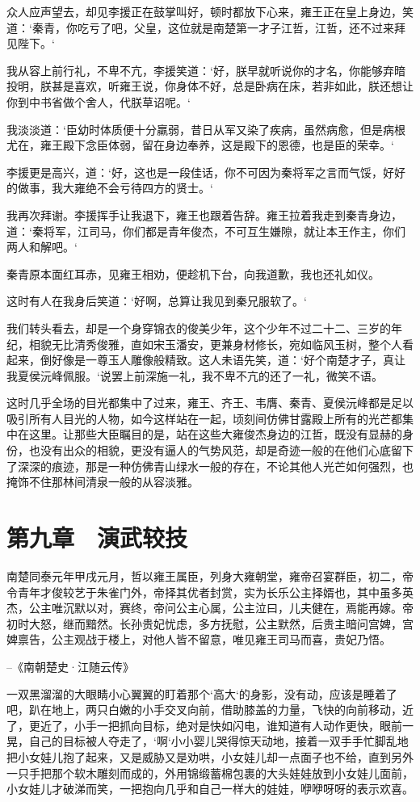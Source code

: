 众人应声望去，却见李援正在鼓掌叫好，顿时都放下心来，雍王正在皇上身边，笑道：‘秦青，你吃亏了吧，父皇，这位就是南楚第一才子江哲，江哲，还不过来拜见陛下。‘

我从容上前行礼，不卑不亢，李援笑道：‘好，朕早就听说你的才名，你能够弃暗投明，朕甚是喜欢，听雍王说，你身体不好，总是卧病在床，若非如此，朕还想让你到中书省做个舍人，代朕草诏呢。‘

我淡淡道：‘臣幼时体质便十分羸弱，昔日从军又染了疾病，虽然病愈，但是病根尤在，雍王殿下念臣体弱，留在身边奉养，这是殿下的恩德，也是臣的荣幸。‘

李援更是高兴，道：‘好，这也是一段佳话，你不可因为秦将军之言而气馁，好好的做事，我大雍绝不会亏待四方的贤士。‘

我再次拜谢。李援挥手让我退下，雍王也跟着告辞。雍王拉着我走到秦青身边，道：‘秦将军，江司马，你们都是青年俊杰，不可互生嫌隙，就让本王作主，你们两人和解吧。‘

秦青原本面红耳赤，见雍王相劝，便趁机下台，向我道歉，我也还礼如仪。

这时有人在我身后笑道：‘好啊，总算让我见到秦兄服软了。‘

我们转头看去，却是一个身穿锦衣的俊美少年，这个少年不过二十二、三岁的年纪，相貌无比清秀俊雅，直如宋玉潘安，更兼身材修长，宛如临风玉树，整个人看起来，倒好像是一尊玉人雕像般精致。这人未语先笑，道：‘好个南楚才子，真让我夏侯沅峰佩服。‘说罢上前深施一礼，我不卑不亢的还了一礼，微笑不语。

这时几乎全场的目光都集中了过来，雍王、齐王、韦膺、秦青、夏侯沅峰都是足以吸引所有人目光的人物，如今这样站在一起，顷刻间仿佛甘露殿上所有的光芒都集中在这里。让那些大臣瞩目的是，站在这些大雍俊杰身边的江哲，既没有显赫的身份，也没有出众的相貌，更没有逼人的气势风范，却是奇迹一般的在他们心底留下了深深的痕迹，那是一种仿佛青山绿水一般的存在，不论其他人光芒如何强烈，也掩饰不住那林间清泉一般的从容淡雅。

\chapter{第九章　演武较技}

南楚同泰元年甲戌元月，哲以雍王属臣，列身大雍朝堂，雍帝召宴群臣，初二，帝令青年才俊较艺于朱雀门外，帝择其优者封赏，实为长乐公主择婿也，其中虽多英杰，公主唯沉默以对，赛终，帝问公主心属，公主泣曰，儿夫健在，焉能再嫁。帝初时大怒，继而黯然。长孙贵妃忧虑，多方抚慰，公主默然，后贵主暗问宫婢，宫婢禀告，公主观战于楼上，对他人皆不留意，唯见雍王司马而喜，贵妃乃悟。

--《南朝楚史·江随云传》

一双黑溜溜的大眼睛小心翼翼的盯着那个‘高大‘的身影，没有动，应该是睡着了吧，趴在地上，两只白嫩的小手交叉向前，借助膝盖的力量，飞快的向前移动，近了，更近了，小手一把抓向目标，绝对是快如闪电，谁知道有人动作更快，眼前一晃，自己的目标被人夺走了，‘啊‘小小婴儿哭得惊天动地，接着一双手手忙脚乱地把小女娃儿抱了起来，又是威胁又是劝哄，小女娃儿却一点面子也不给，直到另外一只手把那个软木雕刻而成的，外用锦缎蓄棉包裹的大头娃娃放到小女娃儿面前，小女娃儿才破涕而笑，一把抱向几乎和自己一样大的娃娃，咿咿呀呀的表示欢喜。

